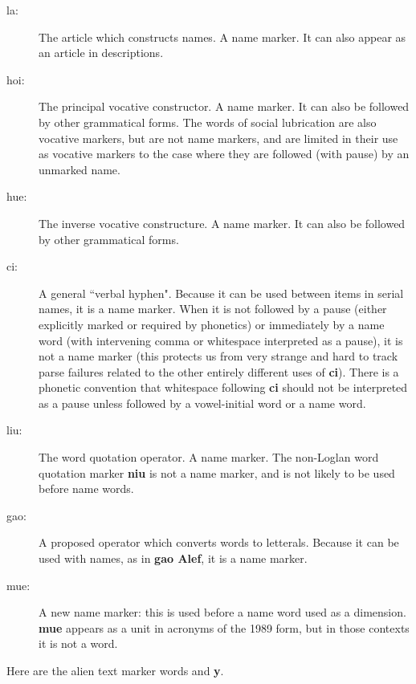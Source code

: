 \documentclass[12pt]{book}
\begin{document}
\begin{description}

\item[la:]  The article which constructs names.  A name marker.  It can also appear as an article in descriptions.

\item[hoi:]  The principal vocative constructor.  A name marker.  It can also be followed by other grammatical forms.  The words of social lubrication are also vocative markers, but are not name markers, and are limited in their use as vocative markers to the case where they are followed (with pause) by an unmarked name.

\item[hue:]  The inverse vocative constructure.  A name marker.  It can also be followed by other grammatical forms.

\item[ci:]  A general ``verbal hyphen".  Because it can be used between items in serial names, it is a name marker.   When it is not followed by a pause (either explicitly marked or required by phonetics) or immediately by a name word (with intervening comma or whitespace interpreted as a pause), it is not a name marker (this protects us from very strange and hard to track parse failures related to the other entirely different uses of {\bf ci}).  There is a phonetic convention that whitespace following {\bf ci} should not be interpreted as a pause unless followed by a vowel-initial word or a name word.

\item[liu:]  The word quotation operator.  A name marker.  The non-Loglan word quotation marker {\bf niu} is not a name marker, and is not likely to be used before name words.

\item[gao:]  A proposed operator which converts words to letterals.  Because it can be used with names, as in {\bf gao Alef}, it is a name marker.

\item[mue:]  A new name marker:  this is used before a name word used as a dimension.  {\bf mue} appears as a unit in acronyms of the 1989 form, but in those contexts it is not a word.

\end{description}

Here are the alien text marker words and {\bf y}.
\end{document}
